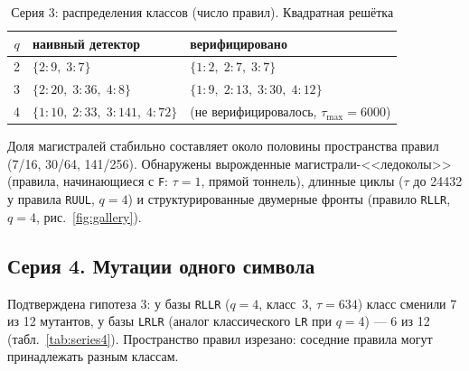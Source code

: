 \documentclass[12pt,a4paper]{article}
\begin{document}
	\begin{table}[H]
		\centering
		\caption{Серия 3: распределения классов (число правил). Квадратная решётка}
		\label{tab:series3}
		\begin{tabular}{cll}
			\toprule
			$q$ & наивный детектор & верифицировано \\
			\midrule
			2 & $\{2\!:9,\; 3\!:7\}$                & $\{1\!:2,\; 2\!:7,\; 3\!:7\}$ \\
			3 & $\{2\!:20,\; 3\!:36,\; 4\!:8\}$     & $\{1\!:9,\; 2\!:13,\; 3\!:30,\; 4\!:12\}$ \\
			4 & $\{1\!:10,\; 2\!:33,\; 3\!:141,\; 4\!:72\}$ & (не верифицировалось, $\tau_{\max}=6000$) \\
			\bottomrule
		\end{tabular}
	\end{table}
	
	Доля магистралей стабильно составляет около половины пространства правил (7/16, 30/64, 141/256). Обнаружены вырожденные магистрали-<<ледоколы>> (правила, начинающиеся с \texttt{F}: $\tau=1$, прямой тоннель), длинные циклы ($\tau$ до 24432 у правила \texttt{RUUL}, $q=4$) и структурированные двумерные фронты (правило \texttt{RLLR}, $q=4$, рис.~\ref{fig:gallery}).
	
	\subsection{Серия 4. Мутации одного символа}
	Подтверждена гипотеза 3: у базы \texttt{RLLR} ($q=4$, класс~3, $\tau=634$) класс сменили 7 из 12 мутантов, у базы \texttt{LRLR} (аналог классического \texttt{LR} при $q=4$) --- 6 из 12 (табл.~\ref{tab:series4}). Пространство правил изрезано: соседние правила могут принадлежать разным классам.
	
\end{document}
